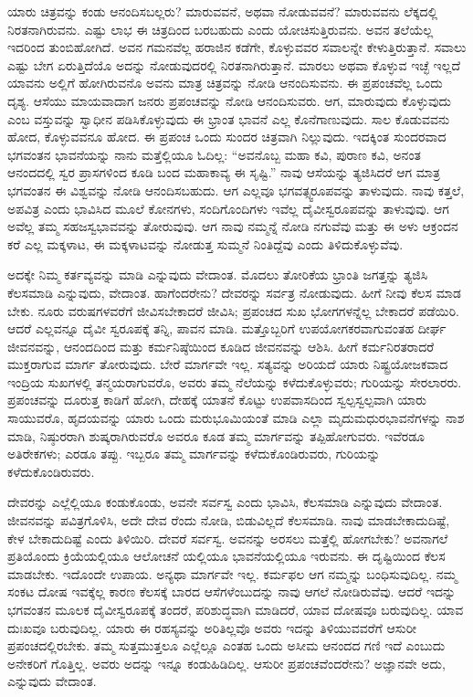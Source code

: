 ಯಾರು ಚಿತ್ರವನ್ನು ಕಂಡು ಆನಂದಿಸಬಲ್ಲರು? ಮಾರುವವನೆ, ಅಥವಾ ನೋಡುವವನೆ? ಮಾರುವವನು ಲೆಕ್ಕದಲ್ಲಿ ನಿರತನಾಗಿರುವನು. ಎಷ್ಟು ಲಾಭ ಈ ಚಿತ್ರದಿಂದ ಬರಬಹುದು ಎಂದು ಯೋಚಿಸುತ್ತಿರುವನು. ಅವನ ತಲೆಯೆಲ್ಲ ಇದರಿಂದ ತುಂಬಿಹೋಗಿದೆ. ಅವನ ಗಮನವೆಲ್ಲ ಹರಾಜಿನ ಕಡೆಗೇ, ಕೊಳ್ಳುವವರ ಸವಾಲನ್ನೇ ಕೇಳುತ್ತಿರುತ್ತಾನೆ. ಸವಾಲು ಎಷ್ಟು ಬೇಗ ಏರುತ್ತಿದೆಯೊ ಅದನ್ನು ನೋಡುವುದರಲ್ಲಿ ನಿರತನಾಗಿರುತ್ತಾನೆ. ಮಾರಲು ಅಥವಾ ಕೊಳ್ಳುವ ಇಚ್ಛೆ ಇಲ್ಲದೆ ಯಾವನು ಅಲ್ಲಿಗೆ ಹೋಗಿರುವನೊ ಅವನು ಮಾತ್ರ ಚಿತ್ರವನ್ನು ನೋಡಿ ಆನಂದಿಸುವನು. ಈ ಪ್ರಪಂಚವೆಲ್ಲ ಒಂದು ದೃಶ್ಯ. ಆಸೆಯು ಮಾಯವಾದಾಗ ಜನರು ಪ್ರಪಂಚವನ್ನು ನೋಡಿ ಆನಂದಿಸುವರು. ಆಗ, ಮಾರುವುದು ಕೊಳ್ಳುವುದು ಎಂಬ ವಸ್ತುವನ್ನು ಸ್ವಾಧೀನ ಪಡಿಸಿಕೊಳ್ಳುವುದು ಈ ಭ್ರಾಂತ ಭಾವನೆ ಎಲ್ಲ ಕೊನೆಗಾಣುವುದು. ಸಾಲ ಕೊಡುವವನು ಹೋದ, ಕೊಳ್ಳುವವನೂ ಹೋದ. ಈ ಪ್ರಪಂಚ ಒಂದು ಸುಂದರ ಚಿತ್ರವಾಗಿ ನಿಲ್ಲುವುದು. ಇದಕ್ಕಿಂತ ಸುಂದರವಾದ ಭಗವಂತನ ಭಾವನೆಯನ್ನು ನಾನು ಮತ್ತೆಲ್ಲಿಯೂ ಓದಿಲ್ಲ: “ಅವನೊಬ್ಬ ಮಹಾ ಕವಿ, ಪುರಾಣ ಕವಿ, ಅನಂತ ಆನಂದದಲ್ಲಿ ಸ್ವರ ಪ್ರಾಸಗಳಿಂದ ಕೂಡಿ ಬಂದ ಮಹಾಕಾವ್ಯ ಈ ಸೃಷ್ಟಿ.” ನಾವು ಆಸೆಯನ್ನು ತ್ಯಜಿಸಿದರೆ ಆಗ ಮಾತ್ರ ಭಗವಂತನ ಈ ವಿಶ್ವವನ್ನು ನೋಡಿ ಆನಂದಿಸಬಹುದು. ಆಗ ಎಲ್ಲವೂ ಭಗವತ್ಸ್ವರೂಪವನ್ನು ತಾಳುವುದು. ನಾವು ಕತ್ತಲೆ, ಅಪವಿತ್ರ ಎಂದು ಭಾವಿಸಿದ ಮೂಲೆ ಕೋನಗಳು, ಸಂದಿಗೊಂದಿಗಳು ಇವೆಲ್ಲ ದೈವೀಸ್ವರೂಪವನ್ನು ತಾಳುವುವು. ಆಗ ಅವೆಲ್ಲ ತಮ್ಮ ಸಹಜಸ್ವಭಾವವನ್ನು ತೋರುವುವು. ಆಗ ನಾವು ನಮ್ಮನ್ನೆ ನೋಡಿ ನಗುವೆವು ಮತ್ತು ಈ ಅಳು ಆಕ್ರಂದನ ಕರೆ ಎಲ್ಲ ಮಕ್ಕಳಾಟ, ಈ ಮಕ್ಕಳಾಟವನ್ನು ನೋಡುತ್ತ ಸುಮ್ಮನೆ ನಿಂತಿದ್ದೆವು ಎಂದು ತಿಳಿದುಕೊಳ್ಳುವೆವು.

ಅದಕ್ಕೇ ನಿಮ್ಮ ಕರ್ತವ್ಯವನ್ನು ಮಾಡಿ ಎನ್ನುವುದು ವೇದಾಂತ. ಮೊದಲು ತೋರಿಕೆಯ ಭ್ರಾಂತಿ ಜಗತ್ತನ್ನು ತ್ಯಜಿಸಿ ಕೆಲಸಮಾಡಿ ಎನ್ನುವುದು, ವೇದಾಂತ. ಹಾಗೆಂದರೇನು? ದೇವರನ್ನು ಸರ್ವತ್ರ ನೋಡುವುದು. ಹೀಗೆ ನೀವು ಕೆಲಸ ಮಾಡ ಬೇಕು. ನೂರು ವರುಷಗಳವರೆಗೆ ಜೀವಿಸಬೇಕಾದರೆ ಜೀವಿಸಿ; ಪ್ರಪಂಚದ ಸುಖ ಭೋಗಗಳನ್ನೆಲ್ಲ ಬೇಕಾದರೆ ಪಡೆಯಿರಿ. ಆದರೆ ಎಲ್ಲವನ್ನೂ ದೈವೀ ಸ್ವರೂಪಕ್ಕೆ ತನ್ನಿ, ಪಾವನ ಮಾಡಿ. ಮತ್ತೊಬ್ಬರಿಗೆ ಉಪಯೋಗಕರವಾಗುವಂತಹ ದೀರ್ಘ ಜೀವನವನ್ನು, ಆನಂದದಿಂದ ಮತ್ತು ಕರ್ಮನಿಷ್ಠೆಯಿಂದ ಕೂಡಿದ ಜೀವನವನ್ನು ಆಶಿಸಿ. ಹೀಗೆ ಕರ್ಮನಿರತರಾದರೆ ಮುಕ್ತರಾಗುವ ಮಾರ್ಗ ತೋರುವುದು. ಬೇರೆ ಮಾರ್ಗವೇ ಇಲ್ಲ. ಸತ್ಯವನ್ನು ಅರಿಯದೆ ಯಾರು ನಿಷ್ಟ್ರಯೋಜಕವಾದ ಇಂದ್ರಿಯ ಸುಖಗಳಲ್ಲಿ ತನ್ಮಯರಾಗುವರೊ, ಅವರು ತಮ್ಮ ನೆಲೆಯನ್ನು ಕಳೆದುಕೊಳ್ಳುವರು; ಗುರಿಯನ್ನು ಸೇರಲಾರರು. ಪ್ರಪಂಚವನ್ನು ದೂರುತ್ತ ಕಾಡಿಗೆ ಹೋಗಿ, ದೇಹಕ್ಕೆ ಯಾತನೆ ಕೊಟ್ಟು ಉಪವಾಸದಿಂದ ಸ್ವಲ್ಪಸ್ವಲ್ಪವಾಗಿ ಯಾರು ಸಾಯುವರೊ, ಹೃದಯವನ್ನು ಯಾರು ಒಂದು ಮರುಭೂಮಿಯಂತೆ ಮಾಡಿ ಎಲ್ಲಾ ಮೃದುಮಧುರಭಾವನೆಗಳನ್ನು ನಾಶ ಮಾಡಿ, ನಿಷ್ಠುರರಾಗಿ ಶುಷ್ಕರಾಗಿರುವರೊ ಅವರೂ ಕೂಡ ತಮ್ಮ ಮಾರ್ಗವನ್ನು ತಪ್ಪಿಹೋಗುವರು. ಇವೆರಡೂ ಅತಿರೇಕಗಳು; ಎರಡೂ ತಪ್ಪು. ಇಬ್ಬರೂ ತಮ್ಮ ಮಾರ್ಗವನ್ನು ಕಳೆದುಕೊಂಡಿರುವರು, ಗುರಿಯನ್ನು ಕಳೆದುಕೊಂಡಿರುವರು.

ದೇವರನ್ನು ಎಲ್ಲೆಲ್ಲಿಯೂ ಕಂಡುಕೊಂಡು, ಅವನೇ ಸರ್ವಸ್ವ ಎಂದು ಭಾವಿಸಿ, ಕೆಲಸಮಾಡಿ ಎನ್ನುವುದು ವೇದಾಂತ. ಜೀವನವನ್ನು ಪವಿತ್ರಗೊಳಿಸಿ, ಅದೇ ದೇವ ರೆಂದು ನೋಡಿ, ಬಿಡುವಿಲ್ಲದೆ ಕೆಲಸಮಾಡಿ. ನಾವು ಮಾಡಬೇಕಾದುದಿಷ್ಟೆ, ಕೇಳ ಬೇಕಾದುದಿಷ್ಟೆ ಎಂದು ತಿಳಿಯಿರಿ. ದೇವರೆ ಸರ್ವಸ್ವ. ಅವನನ್ನು ಅರಸಲು ಮತ್ತೆಲ್ಲಿ ಹೋಗಬೇಕು? ಅವನಾಗಲೆ ಪ್ರತಿಯೊಂದು ಕ್ರಿಯೆಯಲ್ಲಿಯೂ ಆಲೋಚನೆ ಯಲ್ಲಿಯೂ ಭಾವನೆಯಲ್ಲಿಯೂ ಇರುವನು. ಈ ದೃಷ್ಟಿಯಿಂದ ಕೆಲಸ ಮಾಡಬೇಕು. ಇದೊಂದೇ ಉಪಾಯ. ಅನ್ಯಥಾ ಮಾರ್ಗವೇ ಇಲ್ಲ. ಕರ್ಮಫಲ ಆಗ ನಮ್ಮನ್ನು ಬಂಧಿಸುವುದಿಲ್ಲ. ನಮ್ಮ ಸಂಕಟ ದೋಷ ಇವಕ್ಕೆಲ್ಲ ಕಾರಣ ಕೆಲಸಕ್ಕೆ ಬಾರದ ಆಸೆಗಳೆಂಬುದನ್ನು ನಾವು ಆಗಲೆ ನೋಡಿರುವೆವು. ಆದರೆ ಇದನ್ನು ಭಗವಂತನ ಮೂಲಕ ದೈವೀಸ್ವರೂಪಕ್ಕೆ ತಂದರೆ, ಪರಿಶುದ್ಧವಾಗಿ ಮಾಡಿದರೆ, ಯಾವ ದೋಷವೂ ಬರುವುದಿಲ್ಲ. ಯಾವ ದುಃಖವೂ ಬರುವುದಿಲ್ಲ. ಯಾರು ಈ ರಹಸ್ಯವನ್ನು ಅರಿತಿಲ್ಲವೊ ಅವರು ಇದನ್ನು ತಿಳಿಯುವವರೆಗೆ ಆಸುರೀ ಪ್ರಪಂಚದಲ್ಲಿರಬೇಕು. ತಮ್ಮ ಸುತ್ತಮುತ್ತಲೂ ಎಲ್ಲೆಲ್ಲೂ ಎಂತಹ ಒಂದು ಅಸೀಮ ಆನಂದದ ಗಣಿ ಇದೆ ಎಂಬುದು ಅನೇಕರಿಗೆ ಗೊತ್ತಿಲ್ಲ. ಅವರು ಅದನ್ನು ಇನ್ನೂ ಕಂಡುಹಿಡಿದಿಲ್ಲ. ಆಸುರೀ ಪ್ರಪಂಚವೆಂದರೇನು? ಅಜ್ಞಾನವೇ ಅದು, ಎನ್ನುವುದು ವೇದಾಂತ.

